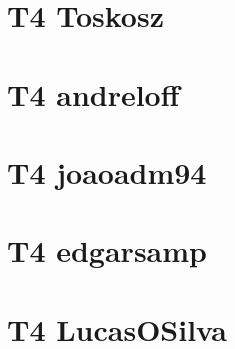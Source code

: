 \chapter{T4 Toskosz}



\chapter{T4 andreloff}



\chapter{T4 joaoadm94}



\chapter{T4 edgarsamp}



\chapter{T4 LucasOSilva}

